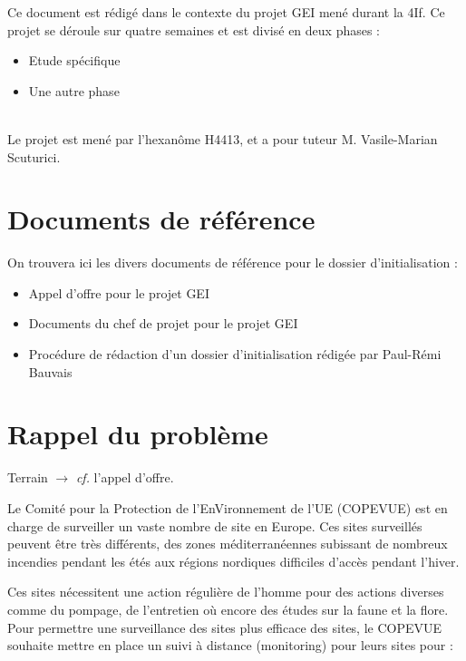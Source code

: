 \documentclass[twoside]{article}
\begin{document}
Ce document est rédigé dans le contexte du projet GEI mené durant la 4If. Ce
projet se déroule sur quatre semaines et est divisé en deux phases :

\begin{itemize}
\item Etude spécifique
\item Une autre phase
\end{itemize}
\hfill\\

Le projet est mené par l'hexanôme H4413, et a pour tuteur M. Vasile-Marian
Scuturici.


\section{Documents de référence}

On trouvera ici les divers documents de référence pour le dossier
d'initialisation :

\begin{itemize}
\item Appel d'offre pour le projet GEI
\item Documents du chef de projet pour le projet GEI
\item Procédure de rédaction d'un dossier d'initialisation rédigée par Paul-Rémi
Bauvais
\end{itemize}


\section{Rappel du problème}
Terrain $\rightarrow$ \textit{cf.} l'appel d'offre.

Le Comité pour la Protection de l'EnVironnement de l'UE (COPEVUE) est en charge de surveiller un vaste nombre de site en Europe. Ces sites surveillés peuvent être très différents, des zones méditerranéennes subissant de nombreux incendies pendant les étés aux régions nordiques difficiles d'accès pendant l'hiver. 

Ces sites nécessitent une action régulière de l'homme pour des actions diverses comme du pompage, de l'entretien où encore des études sur la faune et la flore. Pour permettre une surveillance des sites plus efficace des sites, le COPEVUE souhaite mettre en place un suivi à distance (monitoring) pour leurs sites pour : 
\end{document}
